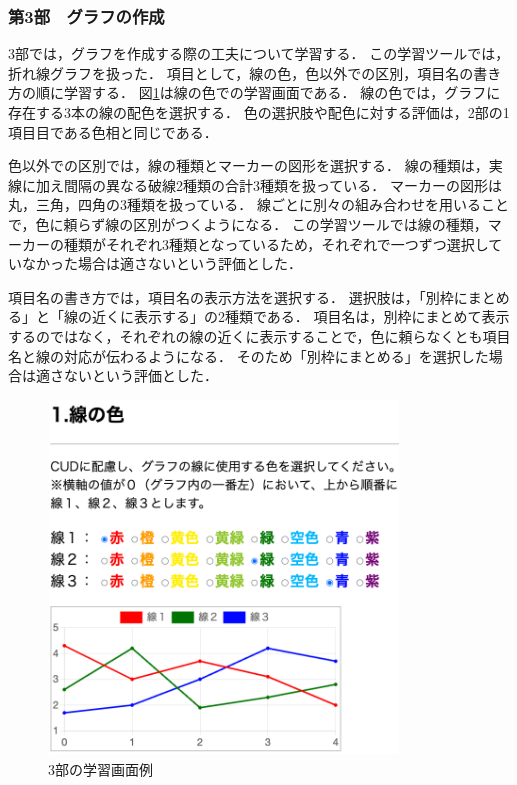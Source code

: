 \clearpage
\subsubsection{第3部　グラフの作成}
3部では，グラフを作成する際の工夫について学習する．
この学習ツールでは，折れ線グラフを扱った．
項目として，線の色，色以外での区別，項目名の書き方の順に学習する．
図\ref{fig:gamen_3bu}は線の色での学習画面である．
線の色では，グラフに存在する3本の線の配色を選択する．
色の選択肢や配色に対する評価は，2部の1項目目である色相と同じである．

色以外での区別では，線の種類とマーカーの図形を選択する．
線の種類は，実線に加え間隔の異なる破線2種類の合計3種類を扱っている．
マーカーの図形は丸，三角，四角の3種類を扱っている．
線ごとに別々の組み合わせを用いることで，色に頼らず線の区別がつくようになる．
この学習ツールでは線の種類，マーカーの種類がそれぞれ3種類となっているため，それぞれで一つずつ選択していなかった場合は適さないという評価とした．

項目名の書き方では，項目名の表示方法を選択する．
選択肢は，「別枠にまとめる」と「線の近くに表示する」の2種類である．
項目名は，別枠にまとめて表示するのではなく，それぞれの線の近くに表示することで，色に頼らなくとも項目名と線の対応が伝わるようになる．
そのため「別枠にまとめる」を選択した場合は適さないという評価とした．

\begin{figure}[h]
\begin{center}
 \includegraphics[clip,width=93mm,height=94mm]{images/gamen_3bu.png}
\end{center}
 \caption{3部の学習画面例}
 \label{fig:gamen_3bu}
\end{figure}
